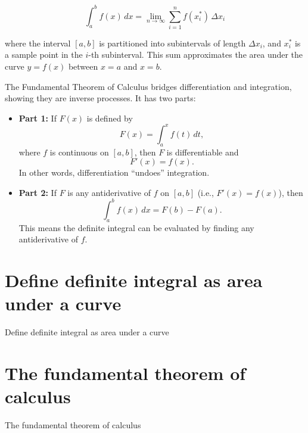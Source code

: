 \documentclass{book}
\begin{document}
\[
\int_a^b f(x) \, dx = \lim_{n \to \infty} \sum_{i=1}^n f(x_i^*) \, \Delta x_i
\]

where the interval \([a, b]\) is partitioned into subintervals of length \(\Delta x_i\), and \(x_i^*\) is a sample point in the \(i\)-th subinterval. This sum approximates the area under the curve \( y = f(x) \) between \( x = a \) and \( x = b \).

The Fundamental Theorem of Calculus bridges differentiation and integration, showing they are inverse processes. It has two parts:

\begin{itemize}
    \item \textbf{Part 1:} If \( F(x) \) is defined by
    \[
    F(x) = \int_a^x f(t) \, dt,
    \]
    where \( f \) is continuous on \([a,b]\), then \( F \) is differentiable and
    \[
    F'(x) = f(x).
    \]
    In other words, differentiation “undoes” integration.

    \item \textbf{Part 2:} If \( F \) is any antiderivative of \( f \) on \([a,b]\) (i.e., \( F'(x) = f(x) \)), then
    \[
    \int_a^b f(x) \, dx = F(b) - F(a).
    \]
    This means the definite integral can be evaluated by finding any antiderivative of \( f \).
\end{itemize}

\section{Define definite integral as area under a curve}

Define definite integral as area under a curve

\section{The fundamental theorem of calculus}

The fundamental theorem of calculus




\backmatter
 
\end{document}
